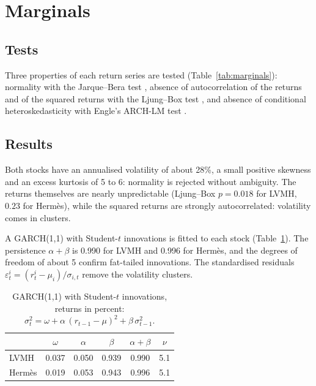 \documentclass[11pt,a4paper]{article}
\begin{document}
\section{Marginals}\label{sec:marginals}

\subsection{Tests}
Three properties of each return series are tested (Table~\ref{tab:marginals}): normality with the Jarque--Bera test
\cite{jarquebera1980}, absence of autocorrelation of the returns and of the squared returns with the Ljung--Box test
\cite{ljungbox1978}, and absence of conditional heteroskedasticity with Engle's ARCH-LM test \cite{engle1982}.

\subsection{Results}
Both stocks have an annualised volatility of about 28\%, a small positive skewness and an excess kurtosis of 5 to 6:
normality is rejected without ambiguity. The returns themselves are nearly unpredictable (Ljung--Box $p = 0.018$ for
LVMH, $0.23$ for Hermès), while the squared returns are strongly autocorrelated: volatility comes in clusters.

A GARCH(1,1) with Student-$t$ innovations \cite{bollerslev1986,bollerslev1987} is fitted to each stock
(Table~\ref{tab:garch}). The persistence $\alpha + \beta$ is 0.990 for LVMH and 0.996 for Hermès, and the degrees of
freedom of about 5 confirm fat-tailed innovations. The standardised residuals
$\varepsilon^i_t = (r^i_t - \mu_i) / \sigma_{i,t}$ remove the volatility clusters.

\begin{table}[h]
\centering
\begin{tabular}{@{}lccccc@{}}
\toprule
 & $\omega$ & $\alpha$ & $\beta$ & $\alpha + \beta$ & $\nu$ \\
\midrule
LVMH   & 0.037 & 0.050 & 0.939 & 0.990 & 5.1 \\
Hermès & 0.019 & 0.053 & 0.943 & 0.996 & 5.1 \\
\bottomrule
\end{tabular}
\caption{GARCH(1,1) with Student-$t$ innovations, returns in percent:
$\sigma^2_{t} = \omega + \alpha\,(r_{t-1} - \mu)^2 + \beta\,\sigma^2_{t-1}$.}
\label{tab:garch}
\end{table}
\end{document}

